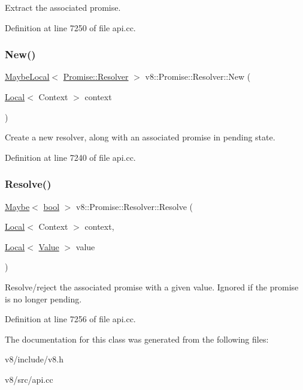 Extract the associated promise. 

Definition at line 7250 of file api.\+cc.

\mbox{\label{classv8_1_1Promise_1_1Resolver_a39d73fbb8db9bb44de553674e2d39409}} 
\subsubsection{\texorpdfstring{New()}{New()}}
{\footnotesize\ttfamily \mbox{\hyperlink{classv8_1_1MaybeLocal}{Maybe\+Local}}$<$ \mbox{\hyperlink{classv8_1_1Promise_1_1Resolver}{Promise\+::\+Resolver}} $>$ v8\+::\+Promise\+::\+Resolver\+::\+New (\begin{DoxyParamCaption}\item[{\mbox{\hyperlink{classv8_1_1Local}{Local}}$<$ Context $>$}]{context }\end{DoxyParamCaption})\hspace{0.3cm}{\ttfamily [static]}}

Create a new resolver, along with an associated promise in pending state. 

Definition at line 7240 of file api.\+cc.

\mbox{\label{classv8_1_1Promise_1_1Resolver_a469d20994b5f5ea55ee4cb6d4573f31a}} 
\subsubsection{\texorpdfstring{Resolve()}{Resolve()}}
{\footnotesize\ttfamily \mbox{\hyperlink{classv8_1_1Maybe}{Maybe}}$<$ \mbox{\hyperlink{classbool}{bool}} $>$ v8\+::\+Promise\+::\+Resolver\+::\+Resolve (\begin{DoxyParamCaption}\item[{\mbox{\hyperlink{classv8_1_1Local}{Local}}$<$ Context $>$}]{context,  }\item[{\mbox{\hyperlink{classv8_1_1Local}{Local}}$<$ \mbox{\hyperlink{classv8_1_1Value}{Value}} $>$}]{value }\end{DoxyParamCaption})}

Resolve/reject the associated promise with a given value. Ignored if the promise is no longer pending. 

Definition at line 7256 of file api.\+cc.



The documentation for this class was generated from the following files\+:\begin{DoxyCompactItemize}
\item 
v8/include/v8.\+h\item 
v8/src/api.\+cc\end{DoxyCompactItemize}
